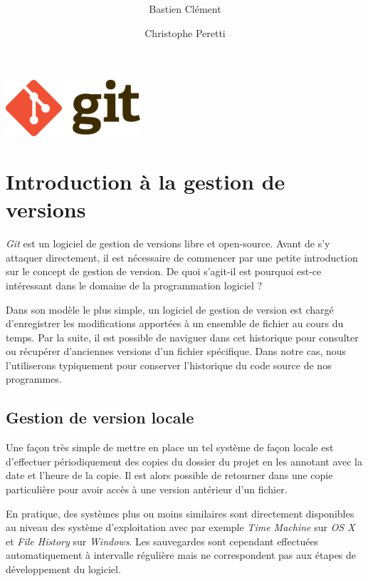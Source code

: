 \documentclass[11pt,a4paper]{article}
\author{Bastien Clément \and Christophe Peretti}
\title{{\normalsize \doccourse} \\ \doctitle }
\begin{document}

\maketitle

\vspace{4cm}
\begin{center}
\includegraphics[width=5cm]{git_logo}
\end{center}

\pagebreak

\tableofcontents

\pagebreak
{}

\section{Introduction à la gestion de versions}

\textit{Git} est un logiciel de gestion de versions libre et open-source.
Avant de s'y attaquer directement, il est nécessaire de commencer par une petite introduction sur le concept de gestion de version.
De quoi s'agit-il est pourquoi est-ce intéressant dans le domaine de la programmation logiciel ?

Dans son modèle le plus simple, un logiciel de gestion de version est chargé d'enregistrer les modifications apportées à un ensemble de fichier au cours du temps.
Par la suite, il est possible de naviguer dans cet historique pour consulter ou récupérer d'anciennes versions d'un fichier spécifique.
Dans notre cas, nous l'utiliserons typiquement pour conserver l'historique du code source de nos programmes.

\subsection{Gestion de version locale}

Une façon très simple de mettre en place un tel système de façon locale est d'effectuer périodiquement des copies du dossier du projet en les annotant avec la date et l'heure de la copie.
Il est alors possible de retourner dans une copie particulière pour avoir accès à une version antérieur d'un fichier.

En pratique, des systèmes plus ou moins similaires sont directement disponibles au niveau des système d'exploitation avec par exemple \textit{Time Machine} sur \textit{OS X} et \textit{File History} sur \textit{Windows}.
Les sauvegardes sont cependant effectuées automatiquement à intervalle régulière mais ne correspondent pas aux étapes de développement du logiciel.
\end{document}
